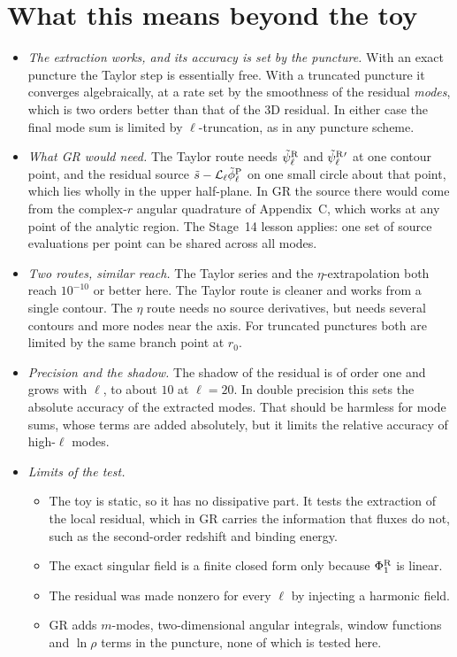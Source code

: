 \documentclass[11pt,a4paper]{article}
\newcommand{\Lop}{\mathcal{L}_\ell}
\newcommand{\psiR}{\tilde\psi^{\rm R}_\ell}
\begin{document}
\section{What this means beyond the toy}
\begin{itemize}[leftmargin=*]
\item \emph{The extraction works, and its accuracy is set by the puncture.}
With an exact puncture the Taylor step is essentially free.
With a truncated puncture it converges algebraically, at a rate set by the smoothness of the residual \emph{modes}, which is two orders better than that of the 3D residual.
In either case the final mode sum is limited by $\ell$-truncation, as in any puncture scheme.
\item \emph{What GR would need.}
The Taylor route needs $\psiR$ and $\psiR{}'$ at one contour point, and the residual source $\tilde s-\Lop\tilde\phi^{\rm P}_\ell$ on one small circle about that point, which lies wholly in the upper half-plane.
In GR the source there would come from the complex-$r$ angular quadrature of Appendix~C, which works at any point of the analytic region.
The Stage~14 lesson applies: one set of source evaluations per point can be shared across all modes.
\item \emph{Two routes, similar reach.}
The Taylor series and the $\eta$-extrapolation both reach $10^{-10}$ or better here.
The Taylor route is cleaner and works from a single contour.
The $\eta$ route needs no source derivatives, but needs several contours and more nodes near the axis.
For truncated punctures both are limited by the same branch point at $r_0$.
\item \emph{Precision and the shadow.}
The shadow of the residual is of order one and grows with $\ell$, to about $10$ at $\ell=20$.
In double precision this sets the absolute accuracy of the extracted modes.
That should be harmless for mode sums, whose terms are added absolutely, but it limits the relative accuracy of high-$\ell$ modes.
\item \emph{Limits of the test.}
\begin{itemize}
\item The toy is static, so it has no dissipative part. It tests the extraction of the local residual, which in GR carries the information that fluxes do not, such as the second-order redshift and binding energy.
\item The exact singular field is a finite closed form only because $\Phi^{\rm R}_1$ is linear.
\item The residual was made nonzero for every $\ell$ by injecting a harmonic field.
\item GR adds $m$-modes, two-dimensional angular integrals, window functions and $\ln\rho$ terms in the puncture, none of which is tested here.
\end{itemize}
\end{itemize}
\end{document}
